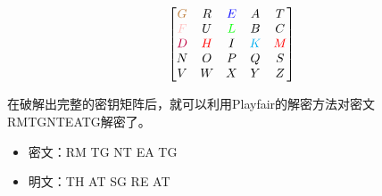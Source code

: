 \[
    \begin{bmatrix}
        \textcolor{brown}{G}  & R                  & \textcolor{blue}{E}  & A                   & T                  \\
        \textcolor{pink}{F}   & U                  & \textcolor{green}{L} & B                   & C                  \\
        \textcolor{purple}{D} & \textcolor{red}{H} & I                    & \textcolor{cyan}{K} & \textcolor{red}{M} \\
        N                     & O                  & P                    & Q                   & S                  \\
        V                     & W                  & X                    & Y                   & Z
    \end{bmatrix}
\]

\vspace{0.5cm}

在破解出完整的密钥矩阵后，就可以利用Playfair的解密方法对密文RMTGNTEATG解密了。

\begin{itemize}
    \item 密文：RM TG NT EA TG
    \item 明文：TH AT SG RE AT
\end{itemize}

\newpage